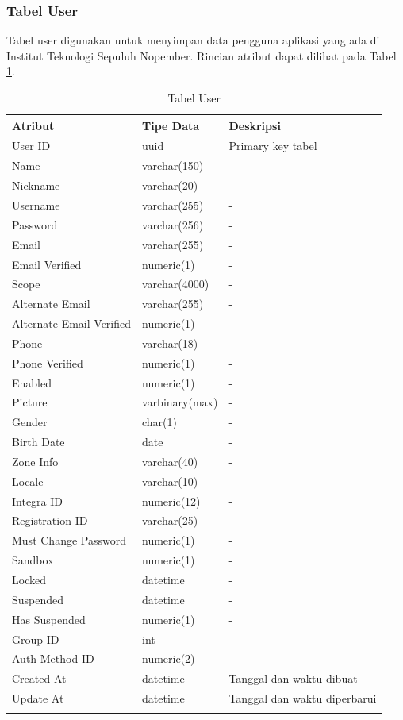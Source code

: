 \subsubsection{Tabel User}
\par Tabel user digunakan untuk menyimpan data pengguna aplikasi yang ada di Institut Teknologi Sepuluh Nopember. Rincian atribut dapat dilihat pada Tabel \ref{tabel_user}.
\begin{longtable}{|p{2cm}|p{2.5cm}|p{4.5cm}|}
    \hline
    \textbf{Atribut} & \textbf{Tipe Data} & \textbf{Deskripsi} \\ \hline
    User ID & uuid & Primary key tabel \\ \hline
    Name & varchar(150) & - \\ \hline
    Nickname & varchar(20) & - \\ \hline
    Username & varchar(255) & - \\ \hline
    Password & varchar(256) & - \\ \hline
    Email & varchar(255) & - \\ \hline
    Email Verified & numeric(1) & - \\ \hline
    Scope & varchar(4000) & - \\ \hline
    Alternate Email & varchar(255) & - \\ \hline
    Alternate Email Verified & numeric(1) & - \\ \hline
    Phone & varchar(18) & - \\ \hline
    Phone Verified & numeric(1) & - \\ \hline
    Enabled & numeric(1) & - \\ \hline
    Picture & varbinary(max) & - \\ \hline
    Gender & char(1) & - \\ \hline
    Birth Date & date & - \\ \hline
    Zone Info & varchar(40) & - \\ \hline
    Locale & varchar(10) & - \\ \hline
    Integra ID & numeric(12) & - \\ \hline
    Registration ID & varchar(25) & - \\ \hline
    Must Change Password & numeric(1) & - \\ \hline
    Sandbox & numeric(1) & - \\ \hline
    Locked & datetime & - \\ \hline
    Suspended & datetime & - \\ \hline
    Has Suspended & numeric(1) & - \\ \hline
    Group ID & int & - \\ \hline
    Auth Method ID & numeric(2) & - \\ \hline
    Created At & datetime & Tanggal dan waktu dibuat \\ \hline
    Update At & datetime & Tanggal dan waktu diperbarui \\ \hline
    \caption{Tabel User}
    \label{tabel_user}
\end{longtable}

